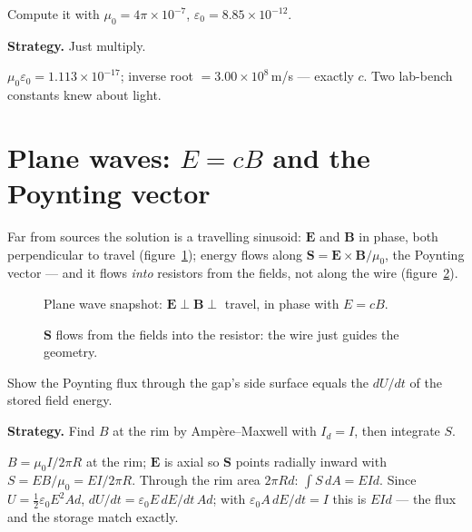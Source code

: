 \begin{example}\label{ex:c}
Compute it with
$\mu_0=4\pi\times10^{-7}$, $\varepsilon_0=8.85\times10^{-12}$.
\par\smallskip
\textbf{Strategy.} Just multiply.
\begin{solution}
$\mu_0\varepsilon_0=1.113\times10^{-17}$; inverse root
$=3.00\times10^{8}$\,m/s --- exactly $c$. Two lab-bench constants knew
about light. \checkmark
\end{solution}
\end{example}

\section{Plane waves: $E=cB$ and the Poynting vector}\label{sec:max-poynt}

Far from sources the solution is a travelling sinusoid:
$\mathbf E$ and $\mathbf B$ in phase, both perpendicular to travel
(figure~\ref{fig:wave}); energy flows along
$\mathbf S=\mathbf E\times\mathbf B/\mu_0$, the Poynting vector ---
and it flows \emph{into} resistors from the fields, not along the wire
(figure~\ref{fig:poynt}).

\begin{figure}[htbp]\centering

\caption{Plane wave snapshot: $\mathbf E\perp\mathbf B\perp$ travel,
in phase with $E=cB$.}
\label{fig:wave}
\end{figure}

\begin{figure}[htbp]\centering

\caption{$\mathbf S$ flows from the fields into the resistor: the wire
just guides the geometry.}
\label{fig:poynt}
\end{figure}

\begin{example}\label{ex:poyntcap}
Show the Poynting flux through the gap's side surface equals the
$dU/dt$ of the stored field energy.
\par\smallskip
\textbf{Strategy.} Find $B$ at the rim by Amp\`ere--Maxwell with
$I_d=I$, then integrate $S$.
\begin{solution}
$B=\mu_0I/2\pi R$ at the rim; $\mathbf E$ is axial so $\mathbf S$
points radially inward with $S=EB/\mu_0=EI/2\pi R$. Through the rim
area $2\pi R d$: $\int S\,dA=EId$. Since
$U=\tfrac12\varepsilon_0E^{2}Ad$, $dU/dt=\varepsilon_0E\,dE/dt\,Ad$;
with $\varepsilon_0A\,dE/dt=I$ this is $EId$ --- the flux and the
storage match exactly. \checkmark
\end{solution}
\end{example}


